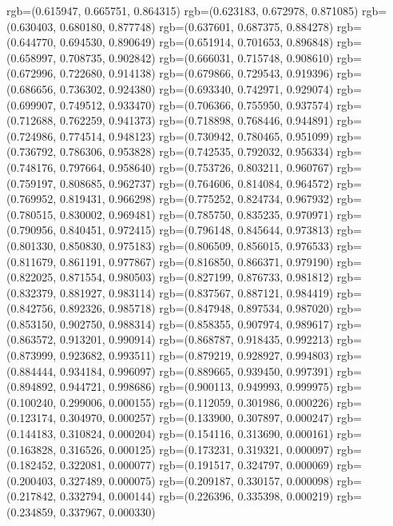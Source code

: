 {{{					rgb=(0.615947, 0.665751, 0.864315)
					rgb=(0.623183, 0.672978, 0.871085)
					rgb=(0.630403, 0.680180, 0.877748)
					rgb=(0.637601, 0.687375, 0.884278)
					rgb=(0.644770, 0.694530, 0.890649)
					rgb=(0.651914, 0.701653, 0.896848)
					rgb=(0.658997, 0.708735, 0.902842)
					rgb=(0.666031, 0.715748, 0.908610)
					rgb=(0.672996, 0.722680, 0.914138)
					rgb=(0.679866, 0.729543, 0.919396)
					rgb=(0.686656, 0.736302, 0.924380)
					rgb=(0.693340, 0.742971, 0.929074)
					rgb=(0.699907, 0.749512, 0.933470)
					rgb=(0.706366, 0.755950, 0.937574)
					rgb=(0.712688, 0.762259, 0.941373)
					rgb=(0.718898, 0.768446, 0.944891)
					rgb=(0.724986, 0.774514, 0.948123)
					rgb=(0.730942, 0.780465, 0.951099)
					rgb=(0.736792, 0.786306, 0.953828)
					rgb=(0.742535, 0.792032, 0.956334)
					rgb=(0.748176, 0.797664, 0.958640)
					rgb=(0.753726, 0.803211, 0.960767)
					rgb=(0.759197, 0.808685, 0.962737)
					rgb=(0.764606, 0.814084, 0.964572)
					rgb=(0.769952, 0.819431, 0.966298)
					rgb=(0.775252, 0.824734, 0.967932)
					rgb=(0.780515, 0.830002, 0.969481)
					rgb=(0.785750, 0.835235, 0.970971)
					rgb=(0.790956, 0.840451, 0.972415)
					rgb=(0.796148, 0.845644, 0.973813)
					rgb=(0.801330, 0.850830, 0.975183)
					rgb=(0.806509, 0.856015, 0.976533)
					rgb=(0.811679, 0.861191, 0.977867)
					rgb=(0.816850, 0.866371, 0.979190)
					rgb=(0.822025, 0.871554, 0.980503)
					rgb=(0.827199, 0.876733, 0.981812)
					rgb=(0.832379, 0.881927, 0.983114)
					rgb=(0.837567, 0.887121, 0.984419)
					rgb=(0.842756, 0.892326, 0.985718)
					rgb=(0.847948, 0.897534, 0.987020)
					rgb=(0.853150, 0.902750, 0.988314)
					rgb=(0.858355, 0.907974, 0.989617)
					rgb=(0.863572, 0.913201, 0.990914)
					rgb=(0.868787, 0.918435, 0.992213)
					rgb=(0.873999, 0.923682, 0.993511)
					rgb=(0.879219, 0.928927, 0.994803)
					rgb=(0.884444, 0.934184, 0.996097)
					rgb=(0.889665, 0.939450, 0.997391)
					rgb=(0.894892, 0.944721, 0.998686)
					rgb=(0.900113, 0.949993, 0.999975)
					rgb=(0.100240, 0.299006, 0.000155)
					rgb=(0.112059, 0.301986, 0.000226)
					rgb=(0.123174, 0.304970, 0.000257)
					rgb=(0.133900, 0.307897, 0.000247)
					rgb=(0.144183, 0.310824, 0.000204)
					rgb=(0.154116, 0.313690, 0.000161)
					rgb=(0.163828, 0.316526, 0.000125)
					rgb=(0.173231, 0.319321, 0.000097)
					rgb=(0.182452, 0.322081, 0.000077)
					rgb=(0.191517, 0.324797, 0.000069)
					rgb=(0.200403, 0.327489, 0.000075)
					rgb=(0.209187, 0.330157, 0.000098)
					rgb=(0.217842, 0.332794, 0.000144)
					rgb=(0.226396, 0.335398, 0.000219)
					rgb=(0.234859, 0.337967, 0.000330)
}}}
